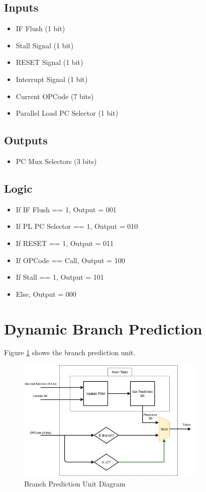 \subsection{Inputs}
\begin{itemize}
    \item IF Flush (1 bit)
    \item Stall Signal (1 bit)
    \item RESET Signal (1 bit)
    \item Interrupt Signal (1 bit)
    \item Current OPCode (7 bits)
    \item Parallel Load PC Selector (1 bit)
\end{itemize}

\subsection{Outputs}
\begin{itemize}
    \item PC Mux Selectors (3 bits)
\end{itemize}

\subsection{Logic}
\begin{itemize}
    \item If IF Flush == 1, Output = 001
    \item If PL PC Selector == 1, Output = 010
    \item If RESET == 1, Output = 011
    \item If OPCode == Call, Output = 100
    \item If Stall == 1, Output = 101
    \item Else, Output = 000
\end{itemize}

\section{Dynamic Branch Prediction}
Figure \ref{fig:bpu} shows the branch prediction unit.
\begin{figure}[hp]
    \centering
    \includegraphics[width=0.8\textwidth]{images/bpu.png}
    \caption{Branch Prediction Unit Diagram}
    \label{fig:bpu}
\end{figure}

